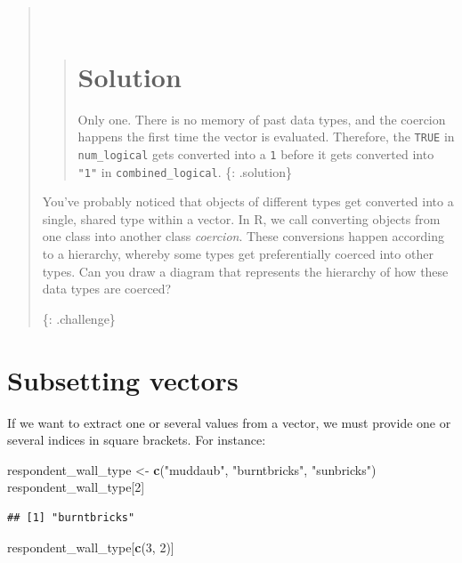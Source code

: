 \documentclass[]{book}
\newenvironment{Shaded}{\begin{snugshade}}{\end{snugshade}}
\newcommand{\KeywordTok}[1]{\textcolor[rgb]{0.13,0.29,0.53}{\textbf{#1}}}
\newcommand{\DecValTok}[1]{\textcolor[rgb]{0.00,0.00,0.81}{#1}}
\newcommand{\StringTok}[1]{\textcolor[rgb]{0.31,0.60,0.02}{#1}}
\newcommand{\NormalTok}[1]{#1}
\begin{document}
\begin{quote}
~

\begin{quote}
\section{Solution}\label{solution-5}

Only one. There is no memory of past data types, and the coercion
happens the first time the vector is evaluated. Therefore, the
\texttt{TRUE} in \texttt{num\_logical} gets converted into a \texttt{1}
before it gets converted into \texttt{"1"} in
\texttt{combined\_logical}. \{: .solution\}
\end{quote}

You've probably noticed that objects of different types get converted
into a single, shared type within a vector. In R, we call converting
objects from one class into another class \emph{coercion}. These
conversions happen according to a hierarchy, whereby some types get
preferentially coerced into other types. Can you draw a diagram that
represents the hierarchy of how these data types are coerced?

\{: .challenge\}
\end{quote}

\section{Subsetting vectors}\label{subsetting-vectors}

If we want to extract one or several values from a vector, we must
provide one or several indices in square brackets. For instance:

\begin{Shaded}
\begin{Highlighting}[]
\NormalTok{respondent_wall_type <-}\StringTok{ }\KeywordTok{c}\NormalTok{(}\StringTok{"muddaub"}\NormalTok{, }\StringTok{"burntbricks"}\NormalTok{, }\StringTok{"sunbricks"}\NormalTok{)}
\NormalTok{respondent_wall_type[}\DecValTok{2}\NormalTok{]}
\end{Highlighting}
\end{Shaded}

\begin{verbatim}
## [1] "burntbricks"
\end{verbatim}

\begin{Shaded}
\begin{Highlighting}[]
\NormalTok{respondent_wall_type[}\KeywordTok{c}\NormalTok{(}\DecValTok{3}\NormalTok{, }\DecValTok{2}\NormalTok{)]}
\end{Highlighting}
\end{Shaded}
\end{document}
